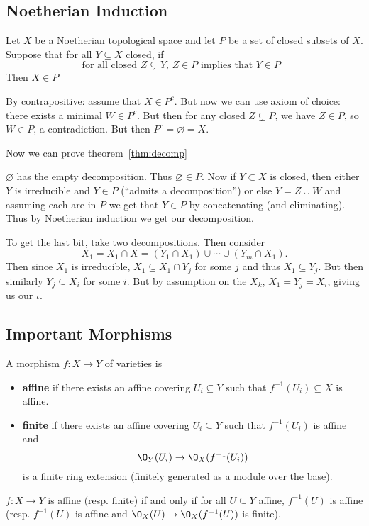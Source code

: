 \documentclass[12pt]{article}
\begin{document}
\subsection{Noetherian Induction}
Let $X$ be a Noetherian topological space and let $P$ be a set of closed subsets of $X$. Suppose that for all $Y\subseteq X$ closed, if 
\[\text{for all closed $Z\subsetneq Y$, $Z\in P$ implies that $Y\in P$ }\]
Then $X\in P$
\begin{prf}
	By contrapositive: assume that $X\in P^c.$ But now we can use axiom of choice: there exists a minimal $W\in P^c$. 
	But then for any closed $Z\subsetneq P$, we have $Z\in P$, so $W\in P$, a contradiction. But then $P^c=\varnothing=X$.
\end{prf}

Now we can prove theorem~\ref{thm:decomp}
\begin{prf}
	$\varnothing$ has the empty decomposition. Thus $\varnothing\in P$. Now if $Y\subset X$ is closed, then either $Y$ is irreducible and $Y\in P$ 
	(``admits a decomposition'') or else $Y=Z\cup W$ and assuming each are in $P$ we get that $Y\in P$ by concatenating (and eliminating). Thus by Noetherian induction we get our decomposition.

	To get the last bit, take two decompositions. Then consider 
	\[X_1=X_1\cap X=(Y_1\cap X_1)\cup\cdots\cup(Y_m\cap X_1).\]
	Then since $X_1$ is irreducible, $X_1\subseteq X_1\cap Y_j$ for some $j$ and thus $X_1\subseteq Y_j$. But then similarly $Y_j\subseteq X_i$ for some $i$.
	But by assumption on the $X_k$, $X_1=Y_j=X_i$, giving us our $\iota$.
\end{prf}

\subsection{Important Morphisms}
\begin{defn}
	A morphism $f:X\to Y$ of varieties is 
	\begin{itemize}
		\item \textbf{affine} if there exists an affine covering $U_i\subseteq Y$ such that $f^{-1}(U_i)\subseteq X$ is affine.
		\item \textbf{finite} if there exists an affine covering $U_i\subseteq Y$ such that $f^{-1}(U_i)$ is affine and 
		\[\O_Y(U_i)\to\O_X(f^{-1}(U_i))\]
		is a finite ring extension (finitely generated as a module over the base).
	\end{itemize}
\end{defn}
\begin{prop}
	$f:X\to Y$ is affine (resp. finite) if and only if for all $U\subseteq Y$ affine, $f^{-1}(U)$ is affine (resp. $f^{-1}(U)$ is affine 
	and $\O_X(U)\to \O_X(f^{-1}(U))$ is finite).
\end{prop}
\end{document}
